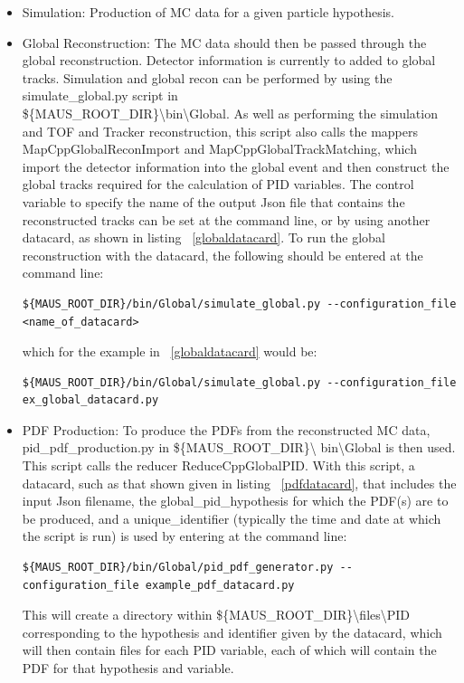 \documentclass[a4paper,12pt]{article}
\begin{document}
\begin{itemize}
\item Simulation: Production of MC data for a given particle 
hypothesis.
\item Global Reconstruction: The MC data should then be passed through 
the global reconstruction. Detector information is currently to added to global tracks. Simulation and global recon can be performed 
by using the simulate\_global.py script in \\
\$\{MAUS\_ROOT\_DIR\}\textbackslash bin\textbackslash Global. As well as performing the simulation
 and TOF and Tracker reconstruction, this script also calls the mappers  
MapCppGlobalReconImport and MapCppGlobalTrackMatching, which import the detector 
information into the global event and then construct the global tracks required 
for the calculation of PID variables. The control variable to specify 
the name of the output Json file that contains the reconstructed tracks can be set at the command line, or by 
using another datacard, as shown in listing ~\ref{globaldatacard}. To run 
the global reconstruction with the datacard, the following should be entered at the command line:

\begin{lstlisting}[breaklines=true,basicstyle=\ttfamily]
${MAUS_ROOT_DIR}/bin/Global/simulate_global.py --configuration_file <name_of_datacard>
\end{lstlisting}

which for the example in ~\ref{globaldatacard} would be:

\begin{lstlisting}[breaklines=true,basicstyle=\ttfamily]
${MAUS_ROOT_DIR}/bin/Global/simulate_global.py --configuration_file ex_global_datacard.py
\end{lstlisting}

\item PDF Production: To produce the PDFs from the reconstructed MC 
data, pid\_pdf\_production.py in \$\{MAUS\_ROOT\_DIR\}\textbackslash 
bin\textbackslash Global is then used. This script calls the reducer 
ReduceCppGlobalPID. With this script, a datacard, such as that shown 
given in listing ~\ref{pdfdatacard}, that includes the input Json filename, the global\_pid\_hypothesis for which the PDF(s) are to be produced, and a unique\_identifier (typically the time and date at which the script is run) is used by entering at the command line:
\begin{lstlisting}[breaklines=true,basicstyle=\ttfamily]
${MAUS_ROOT_DIR}/bin/Global/pid_pdf_generator.py --configuration_file example_pdf_datacard.py
\end{lstlisting}
This will create a directory within \$\{MAUS\_ROOT\_DIR\}\textbackslash files\textbackslash PID corresponding to the hypothesis and identifier given by the datacard, which will then contain files for each PID variable, each of which will contain the PDF for that hypothesis and variable.
\end{itemize}
\end{document}
